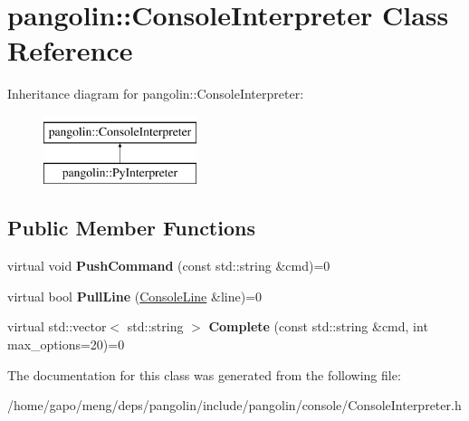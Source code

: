 \hypertarget{classpangolin_1_1_console_interpreter}{}\section{pangolin\+:\+:Console\+Interpreter Class Reference}
\label{classpangolin_1_1_console_interpreter}
Inheritance diagram for pangolin\+:\+:Console\+Interpreter\+:\begin{figure}[H]
\begin{center}
\leavevmode
\includegraphics[height=2.000000cm]{classpangolin_1_1_console_interpreter}
\end{center}
\end{figure}
\subsection*{Public Member Functions}
\begin{DoxyCompactItemize}
\item 
virtual void {\bfseries Push\+Command} (const std\+::string \&cmd)=0\hypertarget{classpangolin_1_1_console_interpreter_a2e7c382a0ae3bcc8d8dd155664f41ece}{}\label{classpangolin_1_1_console_interpreter_a2e7c382a0ae3bcc8d8dd155664f41ece}

\item 
virtual bool {\bfseries Pull\+Line} (\hyperlink{classpangolin_1_1_console_line}{Console\+Line} \&line)=0\hypertarget{classpangolin_1_1_console_interpreter_a9241290da4e778dede19de5c9b8de3c0}{}\label{classpangolin_1_1_console_interpreter_a9241290da4e778dede19de5c9b8de3c0}

\item 
virtual std\+::vector$<$ std\+::string $>$ {\bfseries Complete} (const std\+::string \&cmd, int max\+\_\+options=20)=0\hypertarget{classpangolin_1_1_console_interpreter_addab1784c137ff32d8d48d3488db9d8b}{}\label{classpangolin_1_1_console_interpreter_addab1784c137ff32d8d48d3488db9d8b}

\end{DoxyCompactItemize}


The documentation for this class was generated from the following file\+:\begin{DoxyCompactItemize}
\item 
/home/gapo/meng/deps/pangolin/include/pangolin/console/Console\+Interpreter.\+h\end{DoxyCompactItemize}
